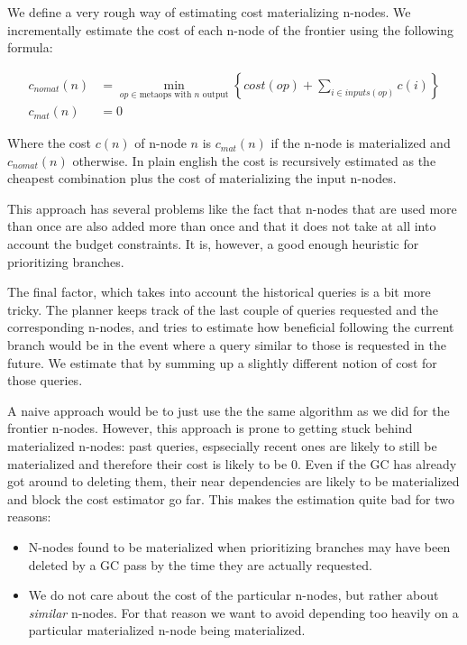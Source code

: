 We define a very rough way
of estimating cost materializing n-nodes. We incrementally estimate the cost of each n-node
of the frontier using the following formula:

\begin{align}
  c_{nomat}(n) &=
    \min\limits_{op \in \text{metaops with \(n\) output}} \left\{ cost(op) + \sum\limits_{i \in inputs(op)} c(i)  \right\} \\
  c_{mat}(n) &= 0
\end{align}

Where the cost \(c(n)\) of n-node \(n\) is \(c_{mat}(n)\) if the n-node
is materialized and \(c_{nomat}(n)\) otherwise. In plain english the
cost is recursively estimated as the cheapest combination 
plus the cost of materializing the input n-nodes.

This approach has several problems like the fact that n-nodes that are
used more than once are also added more than once and that it does not take
at all into account the budget constraints. It is, however, a good
enough heuristic for prioritizing branches.

The final factor, which takes into account the historical queries is a
bit more tricky. The planner keeps track of the last couple of queries
requested and the corresponding n-nodes, and tries to estimate how
beneficial following the current branch would be in the event where
a query similar to those is requested in the future. We estimate that
by summing up a slightly different notion of cost for those queries.

A naive approach would be to just use the the same algorithm as we did
for the frontier n-nodes. However, this approach is prone to getting
stuck behind materialized n-nodes: past queries, espsecially recent ones
are likely to still be materialized and therefore their cost is likely
to be 0. Even if the GC has already got around to deleting them, their near
dependencies are likely to be materialized and block the cost estimator go far. This makes
the estimation quite bad for two reasons:

\begin{itemize}
\item N-nodes found to be materialized when prioritizing branches may have been
  deleted by a GC pass by the time they are actually requested.
\item We do not care about the cost of the particular n-nodes, but rather
  about \emph{similar} n-nodes. For that reason we want to avoid
  depending too heavily on a particular materialized n-node being
  materialized.
\end{itemize}

